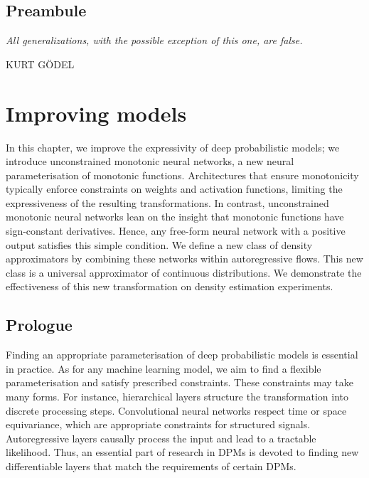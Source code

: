 \thispagestyle{empty}
\section*{Preambule}

\vfill

{
\textit{\justify
All generalizations, with the possible exception of this one, are false.
}

  \par\bigskip
  \raggedleft\MakeUppercase{Kurt G{\"o}del}
  \par%
}

\chapter{Improving models}\label{ch:05}

\begin{chapter_outline}

  In this chapter, we improve the expressivity of deep probabilistic models; we introduce unconstrained monotonic neural networks, a new neural parameterisation of monotonic functions.
  Architectures that ensure monotonicity typically enforce constraints on weights and activation functions, limiting the expressiveness of the resulting transformations.
  In contrast, unconstrained monotonic neural networks lean on the insight that monotonic functions have sign-constant derivatives. Hence, any free-form neural network with a positive output satisfies this simple condition.
  We define a new class of density approximators by combining these networks within autoregressive flows. This new class is a universal approximator of continuous distributions.
  We demonstrate the effectiveness of this new transformation on density estimation experiments.
\end{chapter_outline}

\section{Prologue}
Finding an appropriate parameterisation of deep probabilistic models is essential in practice. As for any machine learning model, we aim to find a flexible parameterisation and satisfy prescribed constraints. These constraints may take many forms. For instance, hierarchical layers structure the transformation into discrete processing steps. Convolutional neural networks respect time or space equivariance, which are appropriate constraints for structured signals. Autoregressive layers causally process the input and lead to a tractable likelihood. Thus, an essential part of research in DPMs is devoted to finding new differentiable layers that match the requirements of certain DPMs.

